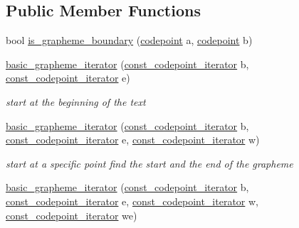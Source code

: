 \subsection*{Public Member Functions}
\begin{DoxyCompactItemize}
\item 
bool \hyperlink{classu5e_1_1basic__grapheme__iterator_ab8c7cfd962ee60c419ac4829c69b80c5}{is\+\_\+grapheme\+\_\+boundary} (\hyperlink{classu5e_1_1codepoint}{codepoint} a, \hyperlink{classu5e_1_1codepoint}{codepoint} b)
\item 
\hyperlink{classu5e_1_1basic__grapheme__iterator_aaf14fa7b9d2a90c065b22ee25737dbd3}{basic\+\_\+grapheme\+\_\+iterator} (\hyperlink{classu5e_1_1basic__grapheme__iterator_a3fd90c1a24fccf790b94199950339846}{const\+\_\+codepoint\+\_\+iterator} b, \hyperlink{classu5e_1_1basic__grapheme__iterator_a3fd90c1a24fccf790b94199950339846}{const\+\_\+codepoint\+\_\+iterator} e)\hypertarget{classu5e_1_1basic__grapheme__iterator_aaf14fa7b9d2a90c065b22ee25737dbd3}{}\label{classu5e_1_1basic__grapheme__iterator_aaf14fa7b9d2a90c065b22ee25737dbd3}

\begin{DoxyCompactList}\small\item\em start at the beginning of the text \end{DoxyCompactList}\item 
\hyperlink{classu5e_1_1basic__grapheme__iterator_a8673d27f847eab67274bdda3fc52ffe7}{basic\+\_\+grapheme\+\_\+iterator} (\hyperlink{classu5e_1_1basic__grapheme__iterator_a3fd90c1a24fccf790b94199950339846}{const\+\_\+codepoint\+\_\+iterator} b, \hyperlink{classu5e_1_1basic__grapheme__iterator_a3fd90c1a24fccf790b94199950339846}{const\+\_\+codepoint\+\_\+iterator} e, \hyperlink{classu5e_1_1basic__grapheme__iterator_a3fd90c1a24fccf790b94199950339846}{const\+\_\+codepoint\+\_\+iterator} w)\hypertarget{classu5e_1_1basic__grapheme__iterator_a8673d27f847eab67274bdda3fc52ffe7}{}\label{classu5e_1_1basic__grapheme__iterator_a8673d27f847eab67274bdda3fc52ffe7}

\begin{DoxyCompactList}\small\item\em start at a specific point find the start and the end of the grapheme \end{DoxyCompactList}\item 
\hyperlink{classu5e_1_1basic__grapheme__iterator_a321800ea886b85f2ac501ce8dca9671a}{basic\+\_\+grapheme\+\_\+iterator} (\hyperlink{classu5e_1_1basic__grapheme__iterator_a3fd90c1a24fccf790b94199950339846}{const\+\_\+codepoint\+\_\+iterator} b, \hyperlink{classu5e_1_1basic__grapheme__iterator_a3fd90c1a24fccf790b94199950339846}{const\+\_\+codepoint\+\_\+iterator} e, \hyperlink{classu5e_1_1basic__grapheme__iterator_a3fd90c1a24fccf790b94199950339846}{const\+\_\+codepoint\+\_\+iterator} w, \hyperlink{classu5e_1_1basic__grapheme__iterator_a3fd90c1a24fccf790b94199950339846}{const\+\_\+codepoint\+\_\+iterator} we)\hypertarget{classu5e_1_1basic__grapheme__iterator_a321800ea886b85f2ac501ce8dca9671a}{}\label{classu5e_1_1basic__grapheme__iterator_a321800ea886b85f2ac501ce8dca9671a}


\end{DoxyCompactItemize}
